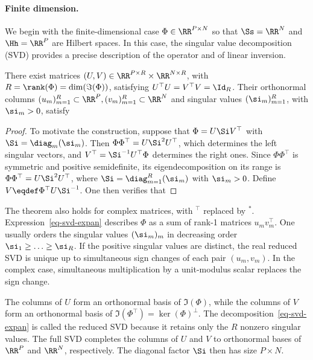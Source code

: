 \paragraph{Finite dimension.}

We begin with the finite-dimensional case $\Phi \in \RR^{P \times N}$ so that $\Ss=\RR^N$ and $\Hh=\RR^P$ are Hilbert spaces.
%
In this case, the singular value decomposition (SVD) provides a precise description of the operator and of linear inversion.

\begin{prop}[SVD]\label{prop-svd}
    There exist matrices $(U,V) \in \RR^{P \times R} \times \RR^{N \times R}$, with $R=\rank(\Phi)=\dim(\Im(\Phi))$, satisfying $U^\top U=V^\top V=\Id_R$. Their orthonormal columns $(u_m)_{m=1}^R \subset \RR^P, (v_m)_{m=1}^R \subset \RR^N$ and singular values $(\si_m)_{m=1}^R$, with $\si_m>0$, satisfy
\end{prop}

\begin{proof}
    To motivate the construction, suppose that $\Phi = U \Si V^\top$ with $\Si = \diag_m(\si_m)$. Then
    $\Phi\Phi^\top=U \Si^2 U^\top$, which determines the left singular vectors, and $V^\top = \Si^{-1} U^\top \Phi$ determines the right ones.
    Since $\Phi\Phi^\top$ is symmetric and positive semidefinite, its eigendecomposition on its range is $\Phi\Phi^\top=U \Si^2 U^\top$, where $\Si = \diag_{m=1}^R(\si_m)$ with $\si_m>0$. Define $V \eqdef \Phi^\top U \Si^{-1}$.
	One then verifies that 
\end{proof}

The theorem also holds for complex matrices, with $^\top$ replaced by $^*$.
%
Expression~\eqref{eq-svd-expan} describes $\Phi$ as a sum of rank-1 matrices $u_m v_m^\top$.
%
One usually orders the singular values $(\si_m)_m$ in decreasing order $\si_1 \geq \ldots \geq \si_R$. If the positive singular values are distinct, the real reduced SVD is unique up to simultaneous sign changes of each pair $(u_m,v_m)$. In the complex case, simultaneous multiplication by a unit-modulus scalar replaces the sign change.

The columns of $U$ form an orthonormal basis of $\Im(\Phi)$, while the columns of $V$ form an orthonormal basis of $\Im(\Phi^\top)=\ker(\Phi)^\bot$.
%
The decomposition~\eqref{eq-svd-expan} is called the reduced SVD because it retains only the $R$ nonzero singular values.
The full SVD completes the columns of $U$ and $V$ to orthonormal bases of $\RR^P$ and $\RR^N$, respectively. The diagonal factor $\Si$ then has size $P\times N$.

